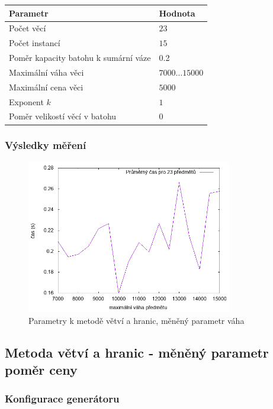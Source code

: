 \documentclass{article}
\begin{document}
\begin{table}[H]
\centering
    \begin{tabular}{ |l|l| } 
        \hline
        Parametr & Hodnota \\
        \hline
        \hline
        Počet věcí & $23$ \\
        Počet instancí & $15$ \\
        Poměr kapacity batohu k sumární váze & 0.2 \\
        Maximální váha věci & $7000 \dots 15000$ \\
        Maximální cena věci & $5000$ \\
        Exponent $k$ & $1$ \\
        Poměr velikostí věcí v batohu & $0$ \\
        \hline
    \end{tabular}
\end{table}

\subsubsection*{Výsledky měření}

\begin{figure}[H]
    \centering
    \includegraphics[width=0.8\textwidth]{inputs-bb-weight/inputs-bb-weight.png}
    \caption{Parametry k metodě větví a hranic, měněný parametr váha}
    \label{fig:g1}
\end{figure}

\subsection{Metoda větví a hranic - měněný parametr poměr ceny}

\subsubsection*{Konfigurace generátoru}
\end{document}
